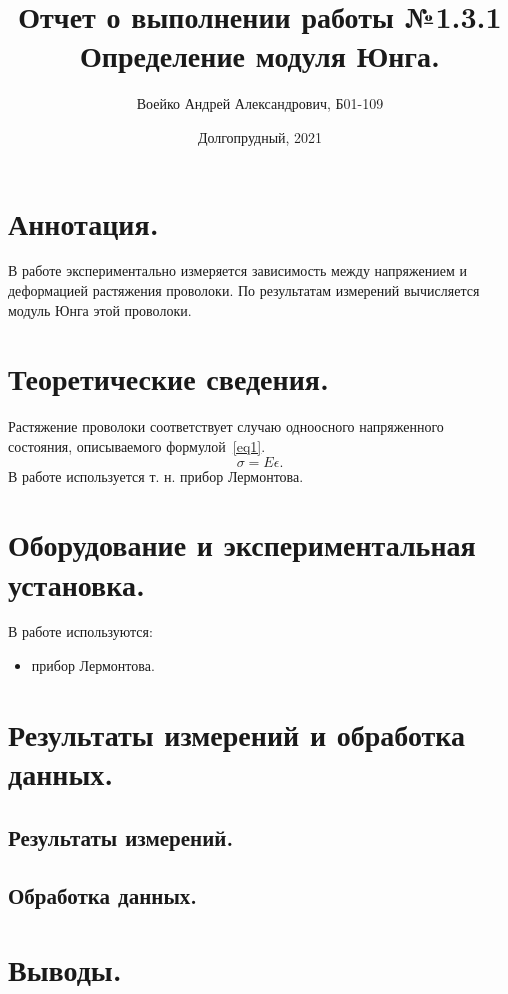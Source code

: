 \documentclass[a4paper,11pt]{article}
\title{Отчет о выполнении работы №1.3.1\\Определение модуля Юнга.}
\author{Воейко Андрей Александрович, Б01-109}
\date{Долгопрудный, 2021}
\begin{document}
\maketitle
\newpage
\section{Аннотация.}
В работе экспериментально измеряется зависимость между напряжением и деформацией растяжения проволоки. По результатам измерений вычисляется модуль Юнга этой проволоки.
\section{Теоретические сведения.}
Растяжение проволоки соответствует случаю одноосного напряженного состояния, описываемого формулой~\ref{eq1}.
\begin{equation}    \label{eq1}
  \sigma = E \epsilon.
\end{equation}
В работе используется т. н. прибор Лермонтова.
\section{Оборудование и экспериментальная установка.}
В работе используются:
\begin{itemize}
        \item прибор Лермонтова.
\end{itemize}
\section{Результаты измерений и обработка данных.}
\subsection{Результаты измерений.}
\subsection{Обработка данных.}
\section{Выводы.}
\end{document}
